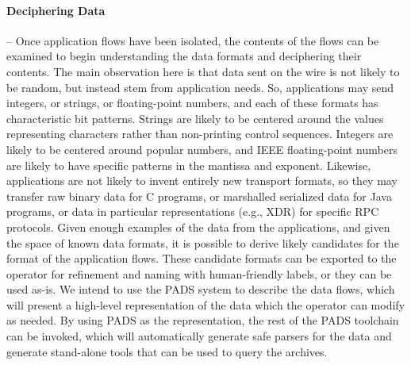 \paragraph*{Deciphering Data} -- Once application flows have been isolated, the
contents of the flows can be examined to begin understanding the data
formats and deciphering their contents. The main observation here is that
data sent on the wire is not likely to be random, but instead stem
from application needs. So, applications may send integers, or
strings, or floating-point numbers, and each of these formats has
characteristic bit patterns. Strings are likely to be centered around
the values representing characters rather than non-printing control
sequences. Integers are likely to be centered around popular numbers,
and IEEE floating-point numbers are likely to have specific patterns
in the mantissa and exponent.  Likewise, applications are not likely
to invent entirely new transport formats, so they may transfer raw
binary data for C programs, or marshalled serialized data for Java
programs, or data in particular representations (e.g., XDR) for
specific RPC protocols. Given enough examples of the data from the
applications, and given the space of known data formats, it is
possible to derive likely candidates for the format of the application
flows. These candidate formats can be exported to the operator for
refinement and naming with human-friendly labels, or they can be used
as-is. We intend to use the PADS system to describe the data flows,
which will present a high-level representation of the data which the
operator can modify as needed. By using PADS as the representation,
the rest of the PADS toolchain can be invoked, which will
automatically generate safe parsers for the data and generate
stand-alone tools that can be used to query the archives.

